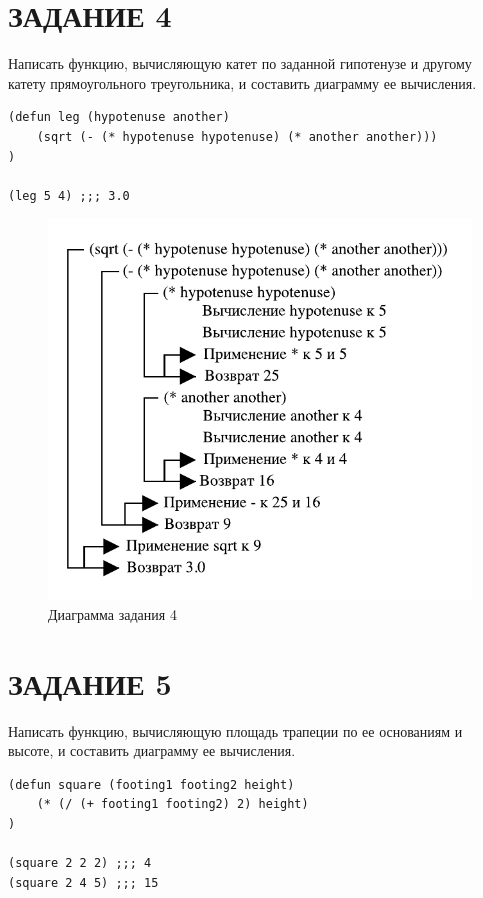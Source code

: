 \section{ЗАДАНИЕ 4}

Написать функцию, вычисляющую катет по заданной гипотенузе и другому катету
прямоугольного треугольника, и составить диаграмму ее вычисления.

\begin{lstlisting}
(defun leg (hypotenuse another)
    (sqrt (- (* hypotenuse hypotenuse) (* another another)))
)

(leg 5 4) ;;; 3.0
\end{lstlisting}

\begin{figure}[H]
    \centering
    \includegraphics{img/04.pdf}
    \caption{Диаграмма задания 4}
\end{figure}

\section{ЗАДАНИЕ 5}

Написать функцию, вычисляющую площадь трапеции по ее основаниям и
высоте, и составить диаграмму ее вычисления.

\begin{lstlisting}
(defun square (footing1 footing2 height)
    (* (/ (+ footing1 footing2) 2) height)
)

(square 2 2 2) ;;; 4
(square 2 4 5) ;;; 15
\end{lstlisting}

